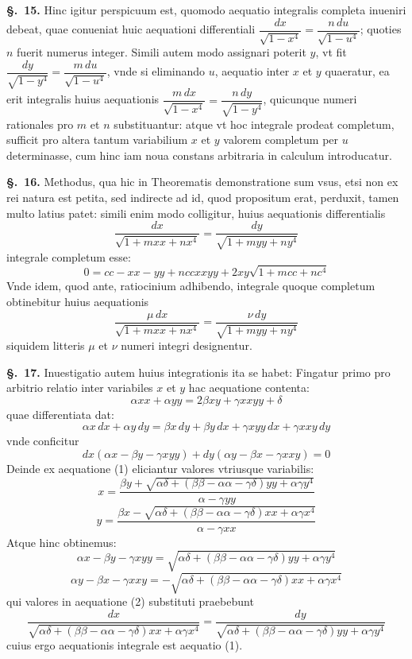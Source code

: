 \documentclass{article}
\begin{document}
\textbf{§.~15.} Hinc igitur perspicuum est, quomodo aequatio integralis completa inueniri
debeat, quae conueniat huic aequationi differentiali
$\dfrac{dx}{\sqrt{1-x^{4}}} = \dfrac{n\,du}{\sqrt{1-u^{4}}}$; quoties $n$ fuerit numerus integer.
Simili autem modo assignari poterit $y$, vt fit
$\dfrac{dy}{\sqrt{1-y^{4}}} = \dfrac{m\,du}{\sqrt{1-u^{4}}}$, vnde si eliminando $u$, aequatio inter
$x$ et $y$ quaeratur, ea erit integralis huius aequationis
$\dfrac{m\,dx}{\sqrt{1-x^{4}}} = \dfrac{n\,dy}{\sqrt{1-y^{4}}}$, quicunque numeri rationales pro $m$
et $n$ substituantur: atque vt hoc integrale prodeat completum, sufficit pro altera tantum
variabilium $x$ et $y$ valorem completum per $u$ determinasse, cum hinc iam noua constans arbitraria
in calculum introducatur.

\textbf{§.~16.} Methodus, qua hic in Theorematis demonstratione sum vsus, etsi non ex rei
natura est petita, sed indirecte ad id, quod propositum erat, perduxit, tamen multo latius patet:
simili enim modo colligitur, huius aequationis differentialis
\[ \frac{dx}{\sqrt{1+mxx+nx^{4}}} = \frac{dy}{\sqrt{1+myy+ny^{4}}} \]
integrale completum esse:
\[ 0 = cc - xx - yy + nccxxyy + 2xy\sqrt{1+mcc+nc^{4}} \]
Vnde idem, quod ante, ratiocinium adhibendo, integrale quoque completum obtinebitur huius
aequationis
\[ \frac{\mu\,dx}{\sqrt{1+mxx+nx^{4}}} = \frac{\nu\,dy}{\sqrt{1+myy+ny^{4}}} \]
siquidem litteris $\mu$ et $\nu$ numeri integri designentur.

\textbf{§.~17.} Inuestigatio autem huius integrationis ita se habet: Fingatur primo pro
arbitrio relatio inter variabiles $x$ et $y$ hac aequatione contenta:
\[ \alpha xx + \alpha yy = 2\beta xy + \gamma xxyy + \delta \tag{1} \]
quae differentiata dat:
\[ \alpha x\,dx + \alpha y\,dy = \beta x\,dy + \beta y\,dx + \gamma xyy\,dx + \gamma xxy\,dy \]
vnde conficitur
\[ dx(\alpha x - \beta y - \gamma xyy) + dy(\alpha y - \beta x - \gamma xxy) = 0 \tag{2} \]
Deinde ex aequatione (1) eliciantur valores vtriusque variabilis:
\[ x = \frac{\beta y + \sqrt{\alpha\delta + (\beta\beta - \alpha\alpha - \gamma\delta)yy + \alpha\gamma y^{4}}}{\alpha - \gamma yy} \]
\[ y = \frac{\beta x - \sqrt{\alpha\delta + (\beta\beta - \alpha\alpha - \gamma\delta)xx + \alpha\gamma x^{4}}}{\alpha - \gamma xx} \]
Atque hinc obtinemus:
\[ \alpha x - \beta y - \gamma xyy = \sqrt{\alpha\delta + (\beta\beta - \alpha\alpha - \gamma\delta)yy + \alpha\gamma y^{4}} \tag{3} \]
\[ \alpha y - \beta x - \gamma xxy = -\sqrt{\alpha\delta + (\beta\beta - \alpha\alpha - \gamma\delta)xx + \alpha\gamma x^{4}} \tag{4} \]
qui valores in aequatione (2) substituti praebebunt
\[ \frac{dx}{\sqrt{\alpha\delta + (\beta\beta - \alpha\alpha - \gamma\delta)xx + \alpha\gamma x^{4}}}
   = \frac{dy}{\sqrt{\alpha\delta + (\beta\beta - \alpha\alpha - \gamma\delta)yy + \alpha\gamma y^{4}}} \tag{5} \]
cuius ergo aequationis integrale est aequatio (1).
\end{document}
